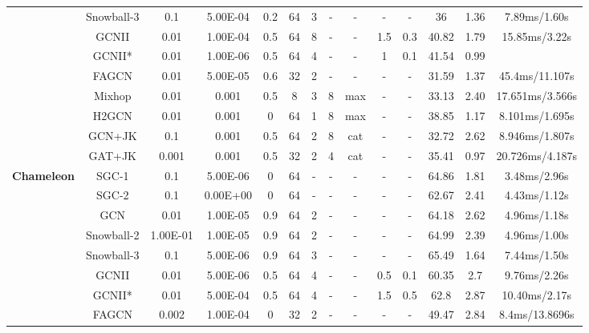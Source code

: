 \documentclass{article}
\newcommand{\0}{{\boldsymbol{0}}}
\newcommand{\6}{{\partial}}
\newcommand{\8}{{\infty}}
\newcommand{\4}{{\nabla}}
\begin{document}
\begin{table}[htbp]
{\begin{tabular}{c|c|cccccccccccc}
          & Snowball-3 & 0.1   & 5.00E-04 & 0.2   & 64    & 3     & -     & -     & -     & -     & 36    & 1.36  & 7.89ms/1.60s \\
          & GCNII & 0.01  & 1.00E-04 & 0.5   & 64    & 8     & -     & -     & 1.5   & 0.3   & 40.82 & 1.79  & 15.85ms/3.22s \\
          & GCNII* & 0.01  & 1.00E-06 & 0.5   & 64    & 4     & -     & -     & 1     & 0.1   & 41.54 & 0.99  &  \\
          & FAGCN & 0.01  & 5.00E-05 & 0.6   & 32    & 2     & -     & -     & -     & -     & 31.59 & 1.37  & 45.4ms/11.107s \\
          &  Mixhop & 0.01  & 0.001 & 0.5   & 8     & 3     & 8     & {max} & - & - & 33.13 & 2.40  & {17.651ms/3.566s} \\
          & H2GCN & 0.01  & 0.001 & 0     & 64    & 1     & 8     & {max} & - & - & 38.85 & 1.17  & {8.101ms/1.695s} \\
          & GCN+JK & 0.1   & 0.001 & 0.5   & 64    & 2     & 8     & {cat} & - & - & 32.72 & 2.62  & {8.946ms/1.807s} \\
          &  GAT+JK & 0.001 & 0.001 & 0.5   & 32    & 2     & 4     & {cat} & - & - & 35.41 & 0.97  & {20.726ms/4.187s} \\
          \midrule
    \multirow{12}[0]{*}{\textbf{Chameleon}} & SGC-1 & 0.1   & 5.00E-06 & 0     & 64    & -     & -     & -     & -     & -     & 64.86 & 1.81  & 3.48ms/2.96s \\
          & SGC-2 & 0.1   & 0.00E+00 & 0     & 64    & -     & -     & -     & -     & -     & 62.67 & 2.41  &  4.43ms/1.12s \\
          & GCN   & 0.01  & 1.00E-05 & 0.9   & 64    & 2     & -     & -     & -     & -     & 64.18 & 2.62  & 4.96ms/1.18s \\
          & Snowball-2 & 1.00E-01 & 1.00E-05 & 0.9   & 64    & 2     & -     & -     & -     & -     & 64.99 & 2.39  & 4.96ms/1.00s \\
          & Snowball-3 & 0.1   & 5.00E-06 & 0.9   & 64    & 3     & -     & -     & -     & -     & 65.49 & 1.64  & 7.44ms/1.50s \\
          & GCNII & 0.01  & 5.00E-06 & 0.5   & 64    & 4     & -     & -     & 0.5   & 0.1   & 60.35 & 2.7   & 9.76ms/2.26s \\
          & GCNII* & 0.01  & 5.00E-04 & 0.5   & 64    & 4     & -     & -     & 1.5   & 0.5   & 62.8  & 2.87  & 10.40ms/2.17s \\
          & FAGCN & 0.002 & 1.00E-04 & 0     & 32    & 2     & -     & -     & -     & -     & 49.47 & 2.84  & 8.4ms/13.8696s \\

\end{tabular}}
\end{table}
\end{document}
